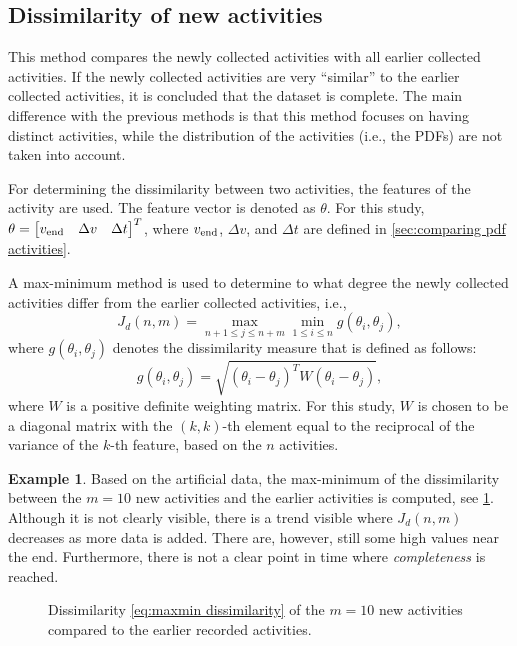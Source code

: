 \documentclass[10pt,final,a4paper,oneside,onecolumn]{article}
\newlength\figurewidth
\newlength\figureheight
\theoremstyle{plain}\newtheorem{definition}{Definition}[section]    %
\theoremstyle{definition}\newtheorem{example}{Example}[section]     %
\theoremstyle{remark}\newtheorem{remarkenv}{Remark}[section]        %
\begin{document}
\subsection{Dissimilarity of new activities}
\label{sec:dissimilarity new activities}

This method compares the newly collected activities with all earlier collected activities. If the newly collected activities are very ``similar'' to the earlier collected activities, it is concluded that the dataset is complete. The main difference with the previous methods is that this method focuses on having distinct activities, while the distribution of the activities (i.e., the PDFs) are not taken into account. 

For determining the dissimilarity between two activities, the features of the activity are used. The feature vector is denoted as $\theta$. For this study, $\theta = \begin{bmatrix} v_{\textup{end}} & \Delta v & \Delta t \end{bmatrix}^T$, where $v_{\textup{end}}$, $\Delta v$, and $\Delta t$ are defined in \cref{sec:comparing pdf activities}.

A max-minimum method is used to determine to what degree the newly collected activities differ from the earlier collected activities, i.e., 
\begin{equation} \label{eq:maxmin dissimilarity}
	J_d(n, m) = \max_{n+1 \leq j \leq n+m} \min_{1 \leq i \leq n} g(\theta_i, \theta_j),
\end{equation}
where $g(\theta_i, \theta_j)$ denotes the dissimilarity measure that is defined as follows:
\begin{equation}
	g(\theta_i, \theta_j) = \sqrt{ \left( \theta_i - \theta_j \right)^T W \left( \theta_i - \theta_j \right)},
\end{equation}
where $W$ is a positive definite weighting matrix. For this study, $W$ is chosen to be a diagonal matrix with the $(k,k)$-th element equal to the reciprocal of the variance of the $k$-th feature, based on the $n$ activities.

\begin{example}
	Based on the artificial data, the max-minimum of the dissimilarity between the $m=10$ new activities and the earlier activities is computed, see \cref{fig:jd}. Although it is not clearly visible, there is a trend visible where $J_d(n,m)$ decreases as more data is added. There are, however, still some high values near the end. Furthermore, there is not a clear point in time where \emph{completeness} is reached.
	
	\setlength{}
	\setlength\figureheight{0.7\figurewidth}
	\begin{figure}
		\centering
		\caption{Dissimilarity \cref{eq:maxmin dissimilarity} of the $m=10$ new activities compared to the earlier recorded activities.}
		\label{fig:jd}
	\end{figure}
\end{example}

\printbibliography
\end{document}
